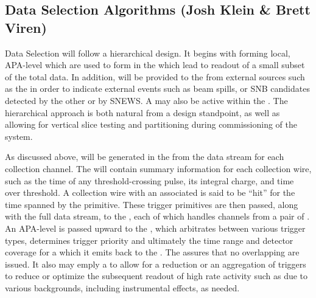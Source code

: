 \subsection{Data Selection Algorithms (Josh Klein \& Brett Viren)}
\label{sec:fdsp-daq-sel}



Data Selection will follow a hierarchical design. 
It begins with forming local, APA-level  which
are used to form   in the
 which lead to readout of a small subset of the total data. 
In addition,  will be provided to the
 from external sources such as the  in order to
indicate external events such as beam spills, or SNB candidates
detected by the other  or by SNEWS.
A  may also be active within the . 
The hierarchical approach is both natural from a design standpoint, as
well as allowing for vertical slice testing and partitioning during
commissioning of the system.

As discussed above,  will be generated in the
 from the data stream for each collection channel. 
The  will contain summary information for each
collection wire, such as the time of any threshold-crossing pulse, its
integral charge, and time over threshold. 
A collection wire with an associated  is said to
be ``hit'' for the time spanned by the primitive. 
These trigger primitives are then passed, along with the full data
stream, to the , each of which handles channels from a pair
of . 
An APA-level  is passed upward to the
, which arbitrates between various trigger types,
determines trigger priority and ultimately the time range and detector
coverage for a  which it emits back to the
.
The  assures that no overlapping  are
issued.
It also may emply a  to allow for a reduction or an
aggregation of triggers to reduce or optimize the subsequent readout
of high rate activity such as due to various backgrounds, including
instrumental effects, as needed.

